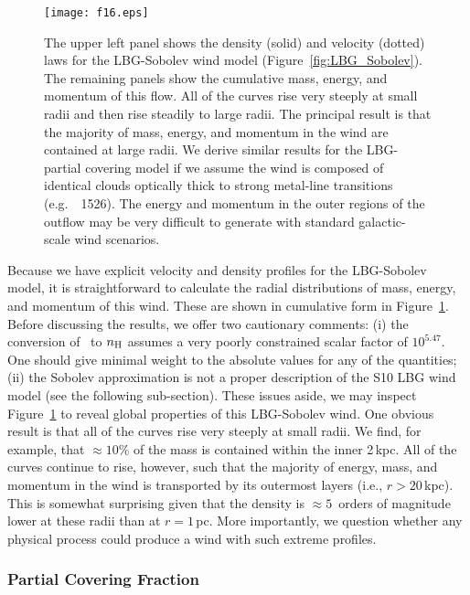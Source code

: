 \documentclass[]{emulateapj}
\begin{document}
\begin{figure}
\texttt{[image: f16.eps]}
\caption{
The upper left panel shows the density (solid) and velocity (dotted)
laws for the LBG-Sobolev wind model (Figure~\ref{fig:LBG_Sobolev}).
The remaining panels show the cumulative mass, energy, and momentum of
this flow.  All of the curves rise very steeply at small radii and
then rise steadily to large radii.  The principal result is that the
majority of mass, energy, and momentum in the wind are contained at
large radii.  We derive similar results for the LBG-partial covering model
if we assume the wind is composed of identical clouds optically thick
to strong metal-line transitions (e.g.\ ~1526).  The
energy and momentum in the outer regions of the outflow may be very
difficult to generate with standard galactic-scale wind scenarios.
}
\label{fig:LBG_cumul}
\end{figure}

Because we have explicit velocity and density profiles for the LBG-Sobolev
model, it is straightforward to calculate the radial
distributions of mass, energy, and momentum of
this wind.  These are shown in cumulative form in
Figure~\ref{fig:LBG_cumul}.  Before discussing the results, we offer
two cautionary comments: (i) the conversion of \nmg\ to $n_{\rm H}$
assumes a very poorly constrained scalar factor of $10^{5.47}$.  One
should give minimal weight to the absolute values for any of the
quantities;
(ii) the Sobolev approximation is not a proper description of the S10
LBG wind model (see the following sub-section).
These issues aside, we may inspect Figure~\ref{fig:LBG_cumul} to reveal
global properties of this LBG-Sobolev wind.
One obvious result is that all of the curves rise very steeply at
small radii.  We find, for example, that $\approx 10\%$ of the mass is
contained within the inner 2\,kpc.  All of the curves continue to
rise, however, such that the majority of energy, mass, and momentum in
the wind is transported by its outermost layers (i.e., $r > 20$\,kpc).
This is somewhat surprising given that the density is $\approx
5$~orders of magnitude lower at these radii than at $r = 1$\,pc.
More importantly, we question whether any physical process could
produce a wind with such extreme profiles. 


\subsubsection{Partial Covering Fraction}
\label{sec:Covering}
\end{document}
